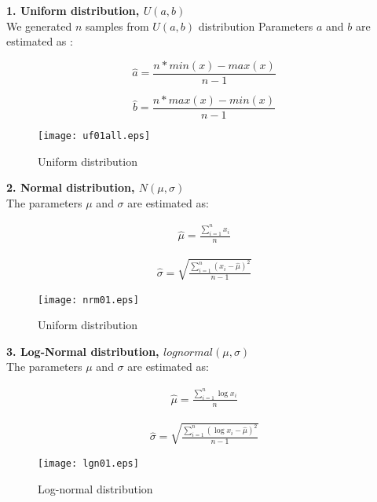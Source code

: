 \documentclass[12pt, reqno]{amsart}
\begin{document}
\newpage
\textbf{1. Uniform distribution, $U(a,b)$}\\
We generated $n$ samples from $U(a,b)$ distribution 
Parameters $a$ and $b$ are estimated as :

\begin{equation}
    \hat{a}=\frac{n* min(x) -max(x)}{n-1}
\end{equation}

\begin{equation}
       \hat{b}=\frac{n*max(x)-min(x)}{n-1}
\end{equation}

\begin{figure}[t]
	\texttt{[image: uf01all.eps]}
	\caption{ Uniform distribution }
	\label{fig:uf}
\end{figure}
\newpage


\textbf{2. Normal distribution, $N(\mu,\sigma)$}\\

The parameters $\mu$ and $\sigma$ are estimated as:

\begin{align}
     \hat{ \mu} =\frac{\displaystyle\sum_{i=1}^{n} x_i}{n} 
 \end{align}

\begin{align}
     \hat{ \sigma}= \sqrt{ \frac{ \sum_{i=1}^n (x_i-\hat{\mu})^2 }{n-1}}
\end{align}

\begin{figure}[t]
	\texttt{[image: nrm01.eps]}
	\caption{ Uniform distribution }
	\label{fig:uf}
\end{figure}

\newpage



\textbf{3. Log-Normal distribution, $lognormal(\mu,\sigma)$}\\

The parameters $\mu$ and $\sigma$ are estimated as:

\begin{align}
     \hat{ \mu} =\frac{\displaystyle\sum_{i=1}^{n} \log x_i}{n} 
 \end{align}

\begin{align}
    \hat{\sigma}= \sqrt{ \frac{\displaystyle \sum_{i=1}^n (\log x_i-\hat{\mu})^2 }{n-1}}
\end{align}

\begin{figure}[t]
	\texttt{[image: lgn01.eps]}
	\caption{ Log-normal distribution }
	\label{fig:lgn}
\end{figure}
\newpage
\end{document}
